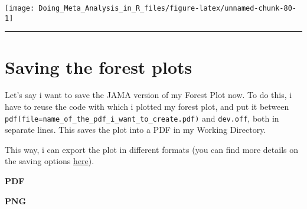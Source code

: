 \documentclass[]{book}
\newenvironment{Shaded}{\begin{snugshade}}{\end{snugshade}}
\newcommand{\KeywordTok}[1]{\textcolor[rgb]{0.13,0.29,0.53}{\textbf{#1}}}
\newcommand{\DataTypeTok}[1]{\textcolor[rgb]{0.13,0.29,0.53}{#1}}
\newcommand{\DecValTok}[1]{\textcolor[rgb]{0.00,0.00,0.81}{#1}}
\newcommand{\StringTok}[1]{\textcolor[rgb]{0.31,0.60,0.02}{#1}}
\newcommand{\NormalTok}[1]{#1}
\theoremstyle{definition}
\theoremstyle{definition}
\theoremstyle{definition}
\theoremstyle{remark}
\begin{document}
\begin{center}\texttt{[image: Doing\_Meta\_Analysis\_in\_R\_files/figure-latex/unnamed-chunk-80-1]} \end{center}

\begin{center}\rule{0.5\linewidth}{\linethickness}\end{center}

\section{Saving the forest plots}\label{saving-the-forest-plots}

Let's say i want to save the JAMA version of my Forest Plot now. To do
this, i have to reuse the code with which i plotted my forest plot, and
put it between
\texttt{pdf(file=\textquotesingle{}name\_of\_the\_pdf\_i\_want\_to\_create.pdf\textquotesingle{})}
and \texttt{dev.off}, both in separate lines. This saves the plot into a
PDF in my Working Directory.

This way, i can export the plot in different formats (you can find more
details on the saving options \protect\hyperlink{saving}{here}).

\textbf{PDF}

\begin{Shaded}
\end{Shaded}

\textbf{PNG}

\begin{Shaded}
\end{Shaded}
\end{document}

